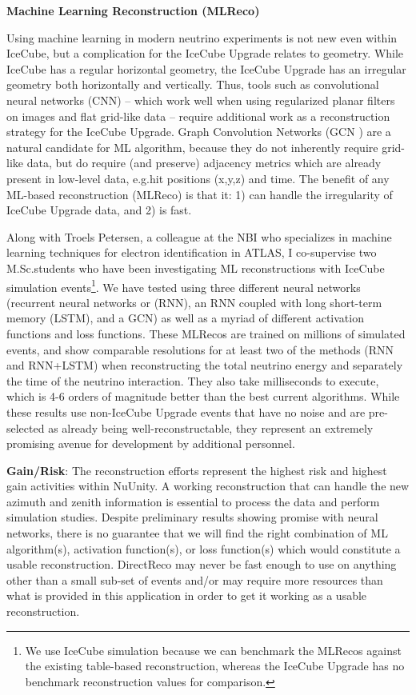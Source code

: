 \documentclass[a4paper,11pt]{article}
\begin{document}
\textbf{Machine Learning Reconstruction (MLReco)}

Using machine learning in modern neutrino experiments is not new\cite{Aurisano:2016jvx} even within IceCube\cite{Aartsen:2017dae}, but a complication for the IceCube Upgrade relates to geometry. While IceCube has a regular horizontal geometry, the IceCube Upgrade has an irregular geometry both horizontally and vertically. Thus, tools such as convolutional neural networks (CNN) -- which work well when using regularized planar filters on images and flat grid-like data -- require additional work as a reconstruction strategy for the IceCube Upgrade. Graph Convolution Networks (GCN \cite{Kipf:2016tc}) are a natural candidate for ML algorithm, because they do not inherently require grid-like data, but do require (and preserve) adjacency metrics which are already present in low-level data, e.g.\@ hit positions (x,y,z) and time. The benefit of any ML-based reconstruction (MLReco) is that it: 1) can handle the irregularity of IceCube Upgrade data, and 2) is fast.

Along with Troels Petersen, a colleague at the NBI who specializes in machine learning techniques for electron identification in ATLAS, I co-supervise two M.Sc.\@ students who have been investigating ML reconstructions with IceCube simulation events\footnote{We use IceCube simulation because we can benchmark the MLRecos against the existing table-based reconstruction, whereas the IceCube Upgrade has no benchmark reconstruction values for comparison.}. We have tested using three different neural networks (recurrent neural networks or (RNN), an RNN coupled with long short-term memory (LSTM), and a GCN) as well as a myriad of different activation functions and loss functions. These MLRecos are trained on millions of simulated events, and show comparable resolutions for at least two of the methods (RNN and RNN+LSTM) when reconstructing the total neutrino energy and separately the time of the neutrino interaction. They also take milliseconds to execute, which is 4-6 orders of magnitude better than the best current algorithms. While these results use non-IceCube Upgrade events that have no noise and are pre-selected as already being well-reconstructable, they represent an extremely promising avenue for development by additional personnel.

\textbf{Gain/Risk}: The reconstruction efforts represent the highest risk and highest gain activities within NuUnity. A working reconstruction that can handle the new azimuth and zenith information is essential to process the data and perform simulation studies. Despite preliminary results showing promise with neural networks, there is no guarantee that we will find the right combination of ML algorithm(s), activation function(s), or loss function(s) which would constitute a usable reconstruction. DirectReco may never be fast enough to use on anything other than a small sub-set of events and/or may require more resources than what is provided in this application in order to get it working as a usable reconstruction.\\
\end{document}
